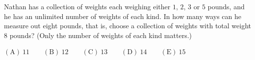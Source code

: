 Nathan has a collection of weights each weighing either $1$, $2$, $3$ or $5$ pounds, and he has an unlimited number of weights of each kind. In how many ways can he measure out eight pounds, that is, choose a collection of weights with total weight $8$ pounds? (Only the number of weights of each kind matters.)

$\mathrm{(A)}\ 11\qquad\mathrm{(B)}\ 12\qquad\mathrm{(C)}\ 13\qquad\mathrm{(D)}\ 14\qquad\mathrm{(E)}\ 15$
